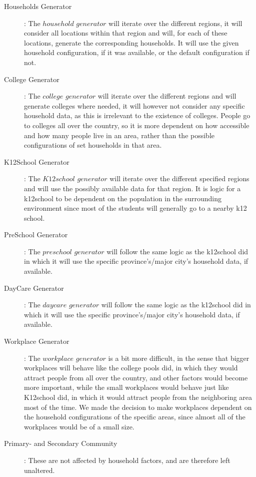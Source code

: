 \begin{description}
	\item[Households Generator]: 
		The $household$ $generator$ will iterate over the different regions, it will consider all locations within that region and will, for each of these locations, generate the corresponding households. It will use the given household configuration, if it was available, or the default configuration if not.
		
	\item[College Generator]:
		The $college$ $generator$ will iterate over the different regions and will generate colleges where needed, it will however not consider any specific household data, as this is irrelevant to the existence of colleges. People go to colleges all over the country, so it is more dependent on how accessible and how many people live in an area, rather than the possible configurations of set households in that area.
		
	\item[K12School Generator]:
		The $K12school$ $generator$ will iterate over the different specified regions and will use the possibly available data for that region. It is logic for a k12school to be dependent on the population in the surrounding environment since most of the students will generally go to a nearby k12 school. 
		
	\item[PreSchool Generator]:
		The $preschool$ $generator$ will follow the same logic as the k12school did in which it will use the specific province's/major city's household data, if available.
		
	\item[DayCare Generator]:
		The $daycare$ $generator$ will follow the same logic as the k12school did in which it will use the specific province's/major city's household data, if available.
		
	\item[Workplace Generator]:
		The $workplace$ $generator$ is a bit more difficult, in the sense that bigger workplaces will behave like the college pools did, in which they would attract people from all over the country, and other factors would become more important, while the small workplaces would behave just like K12school did, in which it would attract people from the neighboring area most of the time. We made the decision to make workplaces dependent on the household configurations of the specific areas, since almost all of the workplaces would be of a small size.
		
	\item[Primary- and Secondary Community]:
		These are not affected by household factors, and are therefore left unaltered.
\end{description}

